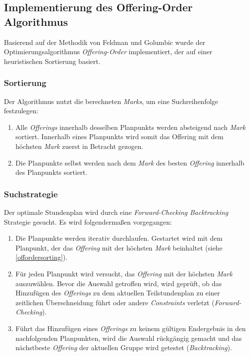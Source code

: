 \subsection{Implementierung des Offering-Order Algorithmus}\label{chap:implementation_offering_order}

Basierend auf der Methodik von Feldman und Golumbic \cite{feldmangolumbic} wurde der Optimierungsalgorithmus \textit{Offering-Order} implementiert, der auf einer heuristischen Sortierung basiert.


\subsubsection{Sortierung\label{offordersorting}}

Der Algorithmus nutzt die berechneten \textit{Marks}, um eine Suchreihenfolge festzulegen:

\begin{enumerate}
    \item Alle \textit{Offerings} innerhalb desselben Planpunkts werden absteigend nach \textit{Mark} sortiert. Innerhalb eines Planpunkts wird somit das Offering mit dem höchsten \textit{Mark} zuerst in Betracht gezogen.
    \item Die Planpunkte selbst werden nach dem \textit{Mark} des besten \textit{Offering} innerhalb des Planpunkts sortiert.
\end{enumerate}


\subsubsection{Suchstrategie}

Der optimale Stundenplan wird durch eine \textit{Forward-Checking Backtracking} Strategie gesucht. Es wird folgendermaßen vorgegangen:

\begin{enumerate}
    \item Die Planpunkte werden iterativ durchlaufen. Gestartet wird mit dem Planpunkt, der das \textit{Offering} mit der höchsten \textit{Mark} beinhaltet (siehe \ref{offordersorting}).
    \item Für jeden Planpunkt wird versucht, das \textit{Offering} mit der höchsten \textit{Mark} auszuwählen. Bevor die Auswahl getroffen wird, wird geprüft, ob das Hinzufügen des \textit{Offerings} zu dem aktuellen Teilstundenplan zu einer zeitlichen Überschneidung führt oder andere \textit{Constraints} verletzt (\textit{Forward-Checking}).
    \item Führt das Hinzufügen eines \textit{Offerings} zu keinem gültigen Endergebnis in den nachfolgenden Planpunkten, wird die Auswahl rückgängig gemacht und das nächstbeste \textit{Offering} der aktuellen Gruppe wird getestet (\textit{Backtracking}).
\end{enumerate}


